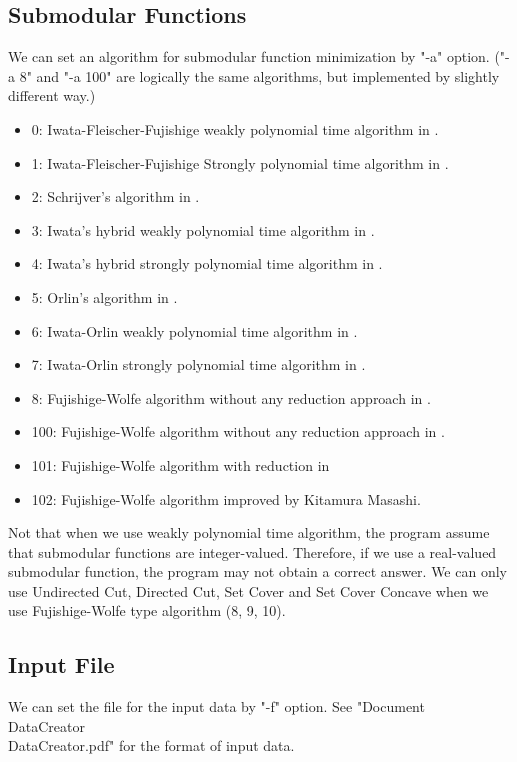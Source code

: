 \documentclass{article}
\begin{document}
\subsection{Submodular Functions}
We can set an algorithm for submodular function minimization by "-a" option.
("-a 8" and "-a 100" are logically the same algorithms, but implemented by slightly different way.)
\begin{itemize}
\item 0: Iwata-Fleischer-Fujishige weakly polynomial time algorithm in \cite{iwaStr}.
\item 1: Iwata-Fleischer-Fujishige Strongly polynomial time algorithm in \cite{iwaStr}.
\item 2: Schrijver's algorithm in \cite{schStr}.
\item 3: Iwata's hybrid weakly polynomial time algorithm in \cite{iwaFast}.
\item 4: Iwata's hybrid strongly polynomial time algorithm in \cite{iwaFast}.
\item 5: Orlin's algorithm in \cite{orlFast}.
\item 6: Iwata-Orlin weakly polynomial time algorithm in \cite{iwaSmpl}.
\item 7: Iwata-Orlin strongly polynomial time algorithm in \cite{iwaSmpl}.
\item 8: Fujishige-Wolfe algorithm without any reduction approach in \cite{fujWolfe}.\textsl{}
\item 100: Fujishige-Wolfe algorithm without any reduction approach in \cite{fujWolfe}.
\item 101: Fujishige-Wolfe algorithm with reduction in \cite{fujExp}
\item 102: Fujishige-Wolfe algorithm improved by Kitamura Masashi.
\end{itemize}
Not that when we use weakly polynomial time algorithm,
the program assume that submodular functions are integer-valued.
Therefore,
if we use a real-valued submodular function,
the program may not obtain a correct answer.
We can only use Undirected Cut, Directed Cut, Set Cover and Set Cover Concave
when we use Fujishige-Wolfe type algorithm (8, 9, 10).

\subsection{Input File}
We can set the file for the input data by "-f" option.
See "Document\\DataCreator\\DataCreator.pdf" for the format of input data.
\end{document}
